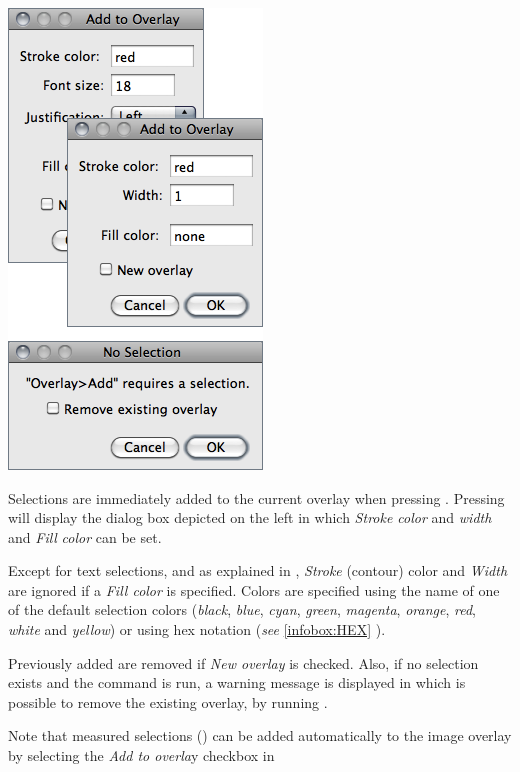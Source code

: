 \subsubsection[{\protect\userinterface{Add Selection\ldots{}\ {[}b{]}}}]{\protect{}\label{sub:Add-Selection...[b]}\improvement{}}

\begin{minipage}[c][1\totalheight][t]{0.373\columnwidth}%
\includegraphics[scale=0.55]{images/AddToOverlay}%
\end{minipage}%
\begin{minipage}[c][1\totalheight][t]{0.627\columnwidth}%
Selections are immediately added to the current overlay when pressing
. Pressing   will
display the dialog box depicted on the left in which\emph{ Stroke
color} and \emph{width} and \emph{Fill} \emph{color} can be set.\medskip{}


Except for text selections, and as explained in ,
\emph{Stroke} (contour) color and \emph{Width} are ignored if a \emph{Fill
color} is specified. Colors are specified using the name of one of
the default selection colors (\emph{black}, \emph{blue}, \emph{cyan},
\emph{green}, \emph{magenta}, \emph{orange},\emph{ red}, \emph{white}
and \emph{yellow}) or using hex notation (\emph{see} \ref{infobox:HEX}
).

\medskip{}
Previously added  are removed if \emph{New
overlay} is checked. Also, if no selection exists and the command
is run, a warning message is displayed in which is possible to remove
the existing overlay, by running .
\medskip{}


Note that measured selections ()
can be added automatically to the image overlay by selecting the \emph{Add
to overla}y checkbox in %
\end{minipage}



